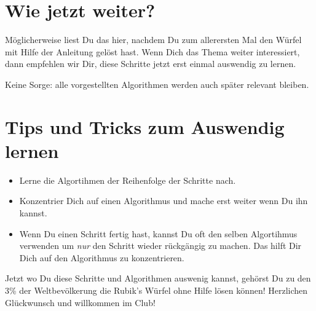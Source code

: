 \section{Wie jetzt weiter?}
Möglicherweise liest Du das hier, nachdem Du zum allerersten Mal den Würfel mit Hilfe der Anleitung gelöst hast. 
Wenn Dich das Thema weiter interessiert, dann empfehlen wir Dir, diese Schritte jetzt erst einmal auswendig zu lernen.

Keine Sorge: alle vorgestellten Algorithmen werden auch später relevant bleiben.

\section{Tips und Tricks zum Auswendig lernen}

\begin{itemize}
	\item Lerne die Algortihmen der Reihenfolge der Schritte nach.
	\item Konzentrier Dich auf einen Algorithmus und mache erst weiter wenn Du ihn kannst.
	\item Wenn Du einen Schritt fertig hast, kannst Du oft den selben Algortihmus verwenden um \emph{nur} den Schritt wieder rückgängig zu machen.
	      Das hilft Dir Dich auf den Algorithmus zu konzentrieren.
\end{itemize}

Jetzt wo Du diese Schritte und Algorithmen auswenig kannst, gehörst Du zu den 3\% der Weltbevölkerung die Rubik's Würfel ohne Hilfe lösen können!
Herzlichen Glückwunsch und willkommen im Club!
